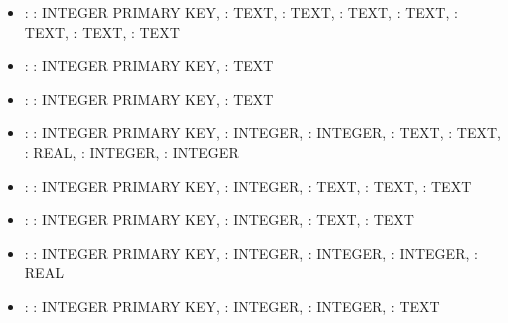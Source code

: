 \documentclass[letterpaper,10pt,polish]{sphinxmanual}
\begin{document}
\sphinxAtStartPar
{}
\begin{itemize}
\item {} 
\sphinxAtStartPar
{}:  : INTEGER PRIMARY KEY,  : TEXT,  : TEXT,  : TEXT,  : TEXT,  : TEXT,  : TEXT,  : TEXT

\item {} 
\sphinxAtStartPar
{}:  : INTEGER PRIMARY KEY,  : TEXT

\item {} 
\sphinxAtStartPar
{}:  : INTEGER PRIMARY KEY,  : TEXT

\item {} 
\sphinxAtStartPar
{}:  : INTEGER PRIMARY KEY,  : INTEGER,  : INTEGER,  : TEXT,  : TEXT,  : REAL,  : INTEGER,  : INTEGER

\item {} 
\sphinxAtStartPar
{}:  : INTEGER PRIMARY KEY,  : INTEGER,  : TEXT,  : TEXT,  : TEXT

\item {} 
\sphinxAtStartPar
{}:  : INTEGER PRIMARY KEY,  : INTEGER,  : TEXT,  : TEXT

\item {} 
\sphinxAtStartPar
{}:  : INTEGER PRIMARY KEY,  : INTEGER,  : INTEGER,  : INTEGER,  : REAL

\item {} 
\sphinxAtStartPar
{}:  : INTEGER PRIMARY KEY,  : INTEGER,  : INTEGER,  : TEXT

\end{itemize}
\end{document}
